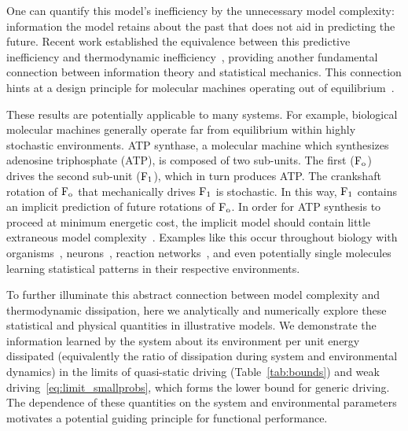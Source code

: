\documentclass[entropy,article,
submit,
moreauthors,pdftex,10pt,a4paper]{mdpi}
\newcommand{\Fo}{{\rm F}_{\rm o}}
\def\F1{{\rm F}_{1}}
\begin{document}
One can
quantify this model's inefficiency
by
the unnecessary model complexity: 
information the model retains about the past 
that does not aid in predicting the future. Recent work established the equivalence between this predictive inefficiency and thermodynamic inefficiency~\cite{Still2012}, providing another fundamental connection between information theory and statistical mechanics. This connection hints at 
a design principle for 
molecular
machines operating out of equilibrium~\cite{Hess:2011:AnnuRevBiomedEng,brown2017toward}. 

These results are potentially applicable to many systems. For example, biological molecular machines generally operate far from equilibrium within highly stochastic environments. ATP synthase, a molecular machine which synthesizes adenosine triphosphate (ATP), is composed of two sub-units. The first ($\Fo$) drives the second sub-unit ($\F1$), which in turn produces ATP. The crankshaft rotation of $\Fo$ that mechanically drives $\F1$ is stochastic. In this way, $\F1$ contains an implicit prediction of future rotations of $\Fo$. In order for ATP synthesis to proceed at minimum energetic cost, the implicit model should contain little extraneous model complexity~\cite{okuno2011rotation}.
Examples like this occur throughout 
biology with organisms~\cite{Tagkopoulos:2008ct}, neurons~\cite{Laughlin:1981wn}, reaction networks~\cite{McGregor:2012ij}, and even potentially single molecules learning statistical patterns in their respective environments.

To further illuminate this abstract connection between model complexity and thermodynamic dissipation, 
here
we analytically and numerically explore these statistical and physical quantities in illustrative models. 
We demonstrate the information learned by the system about its environment per unit energy dissipated (equivalently the ratio of dissipation during system and environmental dynamics) in the limits of quasi-static driving (Table~\ref{tab:bounds}) and weak driving~\eqref{eq:limit_smallprobs}, which forms the lower bound for generic driving. 
The dependence of these quantities on the 
system and environmental 
parameters 
motivates
a potential guiding principle 
for functional performance. 
\end{document}
